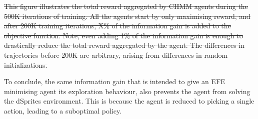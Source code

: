 \documentclass[twoside,11pt]{article}
\providecommand{\DIFdel}[1]{{\protect\color{red}\sout{#1}}}                      %
\providecommand{\DIFdelend}{} %
\providecommand{\DIFdelFL}[1]{\DIFdel{#1}} %
\begin{document}


{%
\DIFdelFL{This figure illustrates the total reward aggregated by CHMM agents during the 500K iterations of training. All the agents start by only maximising reward, and after 200K training iterations, X\% of the information gain is added to the objective function. Note, even adding 1\% of the information gain is enough to drastically reduce the total reward aggregated by the agent. The differences in trajectories before 200K are arbitrary, arising from differences in random initializations.}}

\DIFdelend To conclude, the same information gain that is intended to give an EFE minimising agent its exploration behaviour, also prevents the agent from solving the dSprites environment. This is because the agent is reduced to picking a single action, leading to a suboptimal policy.
\end{document}
